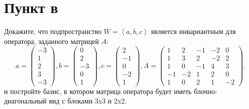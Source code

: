 \documentclass[12pt]{article}
\begin{document}
    \section*{Пункт в}
    Докажите, что подпространство $W = \left < a, b, c \right >$ является инвариантным для оператора, заданного матрицей $A$:
    \[
        a  = \begin{pmatrix}
                 -3 \\ 1 \\ 2 \\ 3 \\ -3
        \end{pmatrix} ,
        b = \begin{pmatrix}
                0 \\ 2 \\ -3 \\ 0 \\ 1
        \end{pmatrix},
        c = \begin{pmatrix}
                2 \\ -1 \\ 0 \\ -2 \\ 1
        \end{pmatrix},
        A =
        \begin{pmatrix}
            1  & 2  & -1 & -2 & 0  \\
            1  & 3  & 2  & -2 & 2  \\
            1  & 0  & -1 & 4  & 3  \\
            -1 & -2 & 1  & 2  & 0  \\
            1  & 0  & 2  & 1  & -2
        \end{pmatrix}
        .
    \]
    и постройте базис, в котором матрица оператора будет иметь блочно-диагональный вид с блоками 3x3 и 2x2.
\end{document}

